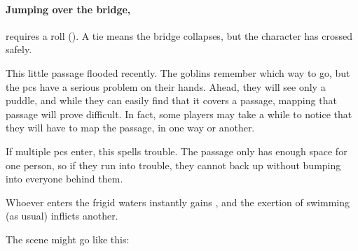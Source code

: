 \begin{multicols}{2}
\paragraph{Jumping over the bridge,}
requires a  roll (\tn[9]).
A tie means the bridge collapses, but the character has crossed safely.


This little passage flooded recently.
The goblins remember which way to go, but the \glspl{pc} have a serious problem on their hands.
Ahead, they will see only a puddle, and while they can easily find that it covers a passage, mapping that passage will prove difficult.
In fact, some players may take a while to notice that they will have to map the passage, in one way or another.

If multiple \glspl{pc} enter, this spells trouble.
The passage only has enough space for one person, so if they run into trouble, they cannot back up without bumping into everyone behind them.

Whoever enters the frigid waters instantly gains , and the exertion of swimming (as usual) inflicts another.

The scene might go like this:


\end{multicols}
